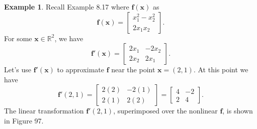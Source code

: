 \documentclass{article}
\newcommand{\R}{\mathbb{R}}
\newcommand{\x}{\mathbf{x}}
\newcommand{\f}{\mathbf{f}}
\theoremstyle{definition}
\newtheorem{example}{Example}[section]
\begin{document}
	\begin{example}
		Recall Example 8.17 where $ \f(\x) $ as $$ \f(\x)=\begin{bmatrix}
			x_1^2-x_2^2\\
			2x_1x_2
		\end{bmatrix}. $$
		For some $ \x\in \R^2 $, we have 
		$$ \f'(\x) = \begin{bmatrix}
			2x_1 &-2x_2\\
			2x_2 & 2x_1
		\end{bmatrix}.$$ Let's use $ \f'(\x) $ to approximate $ \f $ near the point $ \x=(2,1) $. At this point we have $$ \f'(2,1) = \begin{bmatrix}
			2(2)&-2(1)\\2(1) & 2(2)
		\end{bmatrix} = \begin{bmatrix}
			4&-2\\2 & 4
		\end{bmatrix}.$$
		The linear transformation $ \f'(2,1) $, superimposed over the nonlinear $ \f $, is shown in Figure 97. 
		

\end{example}
\end{document}
